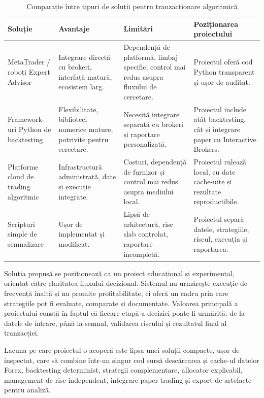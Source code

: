 \begin{table}[htbp]
    \centering
    \caption{Comparație între tipuri de soluții pentru tranzacționare algoritmică}
    \label{tabel:comparatie_solutii}
    \begin{tabular}{|p{3.3cm}|p{4.2cm}|p{4.2cm}|p{3.6cm}|}
        \hline
        \textbf{Soluție} & \textbf{Avantaje} & \textbf{Limitări} & \textbf{Poziționarea proiectului} \\
        \hline
        MetaTrader / roboți Expert Advisor & Integrare directă cu brokeri, interfață matură, ecosistem larg. & Dependență de platformă, limbaj specific, control mai redus asupra fluxului de cercetare. & Proiectul oferă cod Python transparent și ușor de auditat. \\
        \hline
        Framework-uri Python de backtesting & Flexibilitate, biblioteci numerice mature, potrivite pentru cercetare. & Necesită integrare separată cu brokeri și raportare personalizată. & Proiectul include atât backtesting, cât și integrare paper cu Interactive Brokers. \\
        \hline
        Platforme cloud de trading algoritmic & Infrastructură administrată, date și execuție integrate. & Costuri, dependență de furnizor și control mai redus asupra mediului local. & Proiectul rulează local, cu date cache-uite și rezultate reproductibile. \\
        \hline
        Scripturi simple de semnalizare & Ușor de implementat și modificat. & Lipsă de arhitectură, risc slab controlat, raportare incompletă. & Proiectul separă datele, strategiile, riscul, execuția și raportarea. \\
        \hline
    \end{tabular}
\end{table}

Soluția propusă se poziționează ca un proiect educațional și experimental, orientat către claritatea fluxului decizional. Sistemul nu urmărește execuție de frecvență înaltă și nu promite profitabilitate, ci oferă un cadru prin care strategiile pot fi evaluate, comparate și documentate. Valoarea principală a proiectului constă în faptul că fiecare etapă a deciziei poate fi urmărită: de la datele de intrare, până la semnal, validarea riscului și rezultatul final al tranzacției.

Lacuna pe care proiectul o acoperă este lipsa unei soluții compacte, ușor de inspectat, care să combine într-un singur cod sursă descărcarea și cache-ul datelor Forex, backtesting determinist, strategii complementare, allocator explicabil, management de risc independent, integrare paper trading și export de artefacte pentru analiză.

